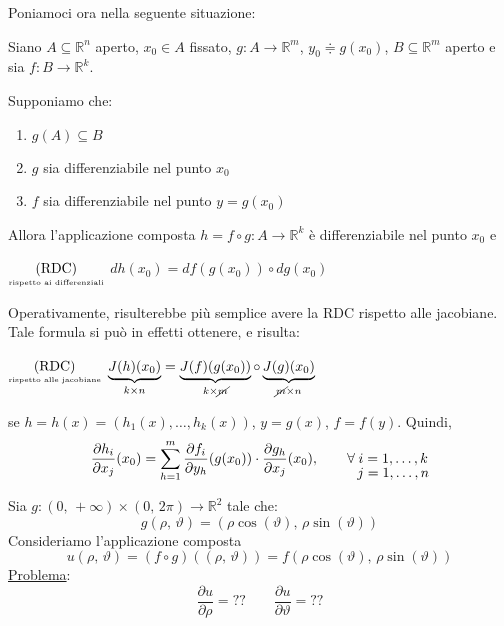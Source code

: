 Poniamoci ora nella seguente situazione:
\begin{center}
\def\svgwidth{14cm}

\end{center}

\begin{thm}
Siano $A \subseteq \mathbb{R}^n$ aperto, $x_0 \in A$ fissato, $g : A \longrightarrow \mathbb{R}^m$, $y_0 \doteqdot g(x_0)$, $B \subseteq \mathbb{R}^m$ aperto e sia $f : B \longrightarrow \mathbb{R}^k$.

Supponiamo che:
\begin{enumerate}[labelindent=\parindent,leftmargin=*,label=\textnormal{(\roman*)},start=1]
\item $g(A) \subseteq B$
\item $g$ sia differenziabile nel punto $x_0$
\item $f$ sia differenziabile nel punto $y = g(x_0)$
\end{enumerate}
Allora l'applicazione composta $h = f \circ g : A \longrightarrow \mathbb{R}^k$ è differenziabile nel punto $x_0$ e
\begin{center}
$\underset{\text{\tiny rispetto ai differenziali}}{\mathrm{(RDC)}}$
\hfill
$\displaystyle dh(x_0) = df(g(x_0)) \circ dg(x_0)$
\hfill \null \\
\end{center}
\end{thm}

\begin{obs}[importante]
Operativamente, risulterebbe più semplice avere la RDC rispetto alle jacobiane. Tale formula si può in effetti ottenere, e risulta:
\begin{center}
$\underset{\text{\tiny rispetto alle jacobiane}}{\mathrm{(RDC)}}$
\hfill
$\displaystyle \underbrace{J(h)(x_0)}_{k \times n} = \underbrace{J(f)(g(x_0))}_{k \times \cancel{m}} \circ \underbrace{J(g)(x_0)}_{\cancel{m} \times n}$
\hfill \null \\
\end{center}
se $h=h(x)=(h_1(x),\ldots,h_k(x))$, $y=g(x)$, $f=f(y)$. Quindi,
$$
\frac{\partial h_i}{\partial x_j}(x_0) = \sum_{h=1}^{m} \frac{\partial f_i}{\partial y_h}(g(x_0)) \cdot \frac{\partial g_h}{\partial x_j}(x_0), \qquad \forall \, \underset{\text{\normalsize $j=1,\ldots,n$}}{i=1,\ldots,k}
$$
\end{obs}

\begin{example}

Sia $g : (0,\,+\infty) \times (0,\,2\pi) \longrightarrow \mathbb{R}^2$ tale che:
$$
g(\rho,\,\vartheta) = \left( \rho\cos(\vartheta) ,\, \rho\sin(\vartheta) \right)
$$
Consideriamo l'applicazione composta
$$
u(\rho,\,\vartheta) = (f \circ g)((\rho,\,\vartheta)) = f\left( \rho\cos(\vartheta) ,\, \rho\sin(\vartheta) \right)
$$
\underline{Problema}:
$$
\frac{\partial u}{\partial \rho} = ?? \qquad \frac{\partial u}{\partial \vartheta} = ??
$$
\end{example}

